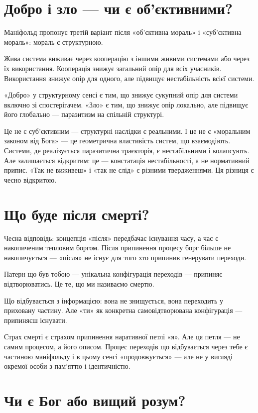 \documentclass[12pt, a4paper, openany]{book}
\begin{document}
\section{Добро і зло --- чи є об'єктивними?}

Маніфольд пропонує третій варіант після «об'єктивна мораль» і «суб'єктивна мораль»: мораль є структурною.

Жива система виживає через кооперацію з іншими живими системами або через їх використання. Кооперація знижує загальний опір для всіх учасників. Використання знижує опір для одного, але підвищує нестабільність всієї системи.

«Добро» у структурному сенсі є тим, що знижує сукупний опір для системи включно зі спостерігачем. «Зло» є тим, що знижує опір локально, але підвищує його глобально --- паразитизм на спільній структурі.

Це не є суб'єктивним --- структурні наслідки є реальними. І це не є «моральним законом від Бога» --- це геометрична властивість систем, що взаємодіють. Системи, де реалізується паразитична траєкторія, є нестабільними і колапсують. Але залишається відкритим: це — констатація нестабільності, а не нормативний припис. «Так не виживеш» і «так не слід» є різними твердженнями. Ця різниця є чесно відкритою.

\section{Що буде після смерті?}

Чесна відповідь: концепція «після» передбачає існування часу, а час є накопиченим тепловим боргом. Після припинення процесу борг більше не накопичується --- «після» не існує для того хто припинив генерувати переходи.

Патерн що був тобою --- унікальна конфігурація переходів --- припиняє відтворюватись. Це те, що ми називаємо смертю.

Що відбувається з інформацією: вона не знищується, вона переходить у приховану частину. Але «ти» як конкретна самовідтворювана конфігурація --- припиняєш існувати.

Страх смерті є страхом припинення наративної петлі «я». Але ця петля — не самим процесом, а його описом. Процес переходів що відбувається через тебе є частиною маніфольду і в цьому сенсі «продовжується» --- але не у вигляді окремої особи з пам'яттю і ідентичністю.

\section{Чи є Бог або вищий розум?}
\end{document}
